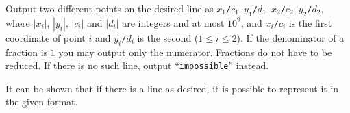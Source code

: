 
    Output two different points on the desired line as \texttt{$x_1$/$c_1$ $y_1$/$d_1$ $x_2$/$c_2$ $y_2$/$d_2$},
	where $|x_i|$, $|y_i|$, $|c_i|$ and $|d_i|$ are integers and at most $10^9$,
	and \texttt{$x_i$/$c_i$} is the first coordinate of point $i$ and \texttt{$y_i$/$d_i$} is the second ($1\leq i\leq2$).
    If the denominator of a fraction is $1$ you may output only the numerator. Fractions do not have to be reduced.
    If there is no such line, output ``\texttt{impossible}'' instead.

	It can be shown that if there is a line as desired, it is possible to represent it in the given format.
